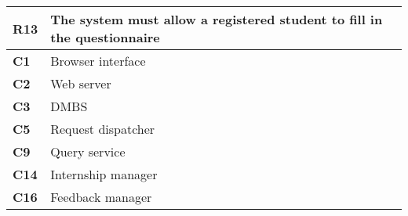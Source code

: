 \begin{table}[H]
    \centering
    \begin{tabular}{|l|m{10cm}|}
        \hline \textbf{R13} & The system must allow a registered student to fill in the questionnaire \\
        \hline \textbf{C1} & Browser interface \\
        \hline \textbf{C2} & Web server \\
        \hline \textbf{C3} & DMBS \\
        \hline \textbf{C5} & Request dispatcher \\
        \hline \textbf{C9} & Query service \\
        \hline \textbf{C14} & Internship manager \\
        \hline \textbf{C16} & Feedback manager \\
        \hline
    \end{tabular}
\end{table}

